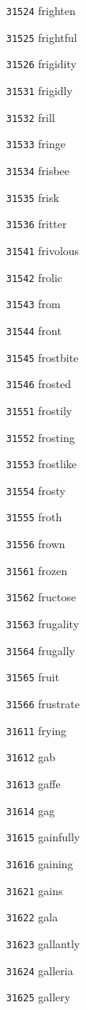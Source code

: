 \documentclass[twoside,11pt]{article}
\begin{document}
\begin{multicols}{5}
\begin{enumerate}
\item[\texttt{31524}] frighten
\item[\texttt{31525}] frightful
\item[\texttt{31526}] frigidity
\item[\texttt{31531}] frigidly
\item[\texttt{31532}] frill
\item[\texttt{31533}] fringe
\item[\texttt{31534}] frisbee
\item[\texttt{31535}] frisk
\item[\texttt{31536}] fritter
\item[\texttt{31541}] frivolous
\item[\texttt{31542}] frolic
\item[\texttt{31543}] from
\item[\texttt{31544}] front
\item[\texttt{31545}] frostbite
\item[\texttt{31546}] frosted
\item[\texttt{31551}] frostily
\item[\texttt{31552}] frosting
\item[\texttt{31553}] frostlike
\item[\texttt{31554}] frosty
\item[\texttt{31555}] froth
\item[\texttt{31556}] frown
\item[\texttt{31561}] frozen
\item[\texttt{31562}] fructose
\item[\texttt{31563}] frugality
\item[\texttt{31564}] frugally
\item[\texttt{31565}] fruit
\item[\texttt{31566}] frustrate
\item[\texttt{31611}] frying
\item[\texttt{31612}] gab
\item[\texttt{31613}] gaffe
\item[\texttt{31614}] gag
\item[\texttt{31615}] gainfully
\item[\texttt{31616}] gaining
\item[\texttt{31621}] gains
\item[\texttt{31622}] gala
\item[\texttt{31623}] gallantly
\item[\texttt{31624}] galleria
\item[\texttt{31625}] gallery

\end{enumerate}
\end{multicols}
\end{document}
